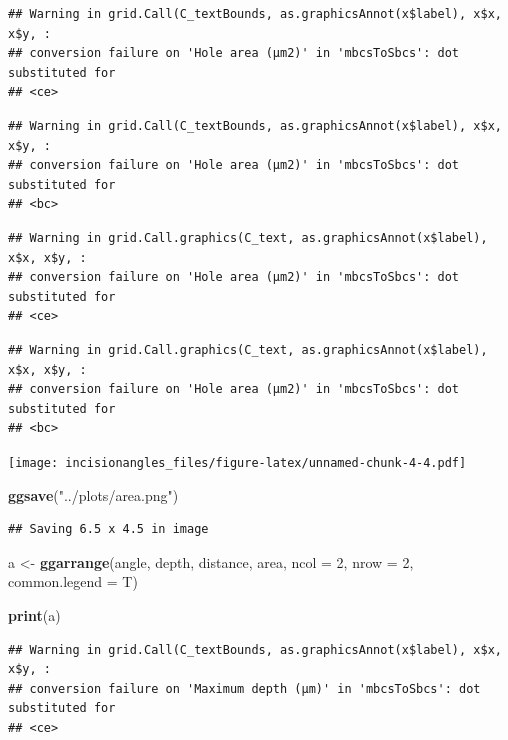 \documentclass[
]{article}
\newenvironment{Shaded}{\begin{snugshade}}{\end{snugshade}}
\newcommand{\AttributeTok}[1]{\textcolor[rgb]{0.13,0.29,0.53}{#1}}
\newcommand{\DecValTok}[1]{\textcolor[rgb]{0.00,0.00,0.81}{#1}}
\newcommand{\FunctionTok}[1]{\textcolor[rgb]{0.13,0.29,0.53}{\textbf{#1}}}
\newcommand{\NormalTok}[1]{#1}
\newcommand{\OtherTok}[1]{\textcolor[rgb]{0.56,0.35,0.01}{#1}}
\newcommand{\StringTok}[1]{\textcolor[rgb]{0.31,0.60,0.02}{#1}}
\begin{document}
\begin{verbatim}
## Warning in grid.Call(C_textBounds, as.graphicsAnnot(x$label), x$x, x$y, :
## conversion failure on 'Hole area (μm2)' in 'mbcsToSbcs': dot substituted for
## <ce>
\end{verbatim}

\begin{verbatim}
## Warning in grid.Call(C_textBounds, as.graphicsAnnot(x$label), x$x, x$y, :
## conversion failure on 'Hole area (μm2)' in 'mbcsToSbcs': dot substituted for
## <bc>
\end{verbatim}

\begin{verbatim}
## Warning in grid.Call.graphics(C_text, as.graphicsAnnot(x$label), x$x, x$y, :
## conversion failure on 'Hole area (μm2)' in 'mbcsToSbcs': dot substituted for
## <ce>
\end{verbatim}

\begin{verbatim}
## Warning in grid.Call.graphics(C_text, as.graphicsAnnot(x$label), x$x, x$y, :
## conversion failure on 'Hole area (μm2)' in 'mbcsToSbcs': dot substituted for
## <bc>
\end{verbatim}

\texttt{[image: incisionangles\_files/figure-latex/unnamed-chunk-4-4.pdf]}

\begin{Shaded}
\begin{Highlighting}[]
\FunctionTok{ggsave}\NormalTok{(}\StringTok{"../plots/area.png"}\NormalTok{)}
\end{Highlighting}
\end{Shaded}

\begin{verbatim}
## Saving 6.5 x 4.5 in image
\end{verbatim}

\begin{Shaded}
\begin{Highlighting}[]
\NormalTok{a }\OtherTok{\textless{}{-}} \FunctionTok{ggarrange}\NormalTok{(angle, depth, distance, area, }\AttributeTok{ncol =} \DecValTok{2}\NormalTok{, }\AttributeTok{nrow =} \DecValTok{2}\NormalTok{, }\AttributeTok{common.legend =}\NormalTok{ T)}

\FunctionTok{print}\NormalTok{(a)}
\end{Highlighting}
\end{Shaded}

\begin{verbatim}
## Warning in grid.Call(C_textBounds, as.graphicsAnnot(x$label), x$x, x$y, :
## conversion failure on 'Maximum depth (μm)' in 'mbcsToSbcs': dot substituted for
## <ce>
\end{verbatim}
\end{document}
